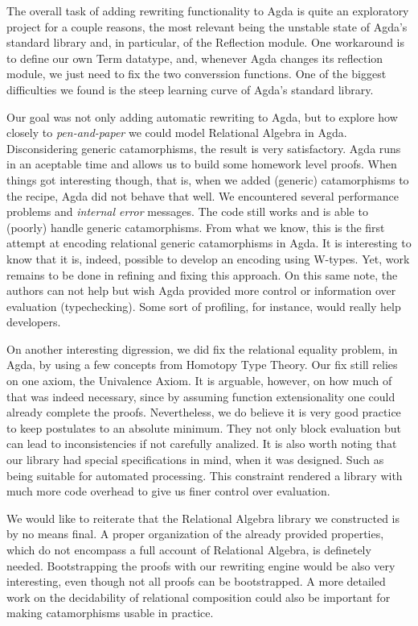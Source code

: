 The overall task of adding rewriting functionality to Agda is quite an exploratory 
project for a couple reasons, the most relevant being the unstable state of Agda's
standard library and, in particular, of the Reflection module. One workaround
is to define our own Term datatype, and, whenever Agda changes its reflection module,
we just need to fix the two converssion functions. One of the biggest difficulties
we found is the steep learning curve of Agda's standard library.

Our goal was not only adding automatic rewriting to Agda, but to explore how closely
to \emph{pen-and-paper} we could model Relational Algebra in Agda. Disconsidering generic catamorphisms,
the result is very satisfactory. Agda runs in an aceptable time and allows us to build
some homework level proofs. When things got interesting though, that is, when we added (generic) catamorphisms to
the recipe, Agda did not behave that well. We encountered several performance problems
and \emph{internal error} messages. The code still works and is able to (poorly) handle
generic catamorphisms. From what we know, this is the first attempt at encoding relational generic catamorphisms
in Agda. It is interesting to know that it is, indeed, possible to develop an encoding using W-types. Yet,
work remains to be done in refining and fixing this approach. On this same note, the authors
can not help but wish Agda provided more control or information over evaluation (typechecking).
Some sort of profiling, for instance, would really help developers.

On another interesting digression, we did fix the relational equality problem, in Agda,
by using a few concepts from Homotopy Type Theory. Our fix still relies on one axiom, the Univalence Axiom.
It is arguable, however, on how much of that was indeed necessary, since by assuming
function extensionality one could already complete the proofs.
Nevertheless, we do believe it is very good practice to keep postulates to an absolute minimum. 
They not only block evaluation but can lead to inconsistencies if not carefully analized. 
It is also worth noting that our library had special specifications in mind, when it was designed.
Such as being suitable for automated processing. This constraint rendered a library
with much more code overhead to give us finer control over evaluation.

We would like to reiterate that the Relational Algebra library we constructed is by no means final.
A proper organization of the already provided properties, which do not encompass a full account
of Relational Algebra, is definetely needed. Bootstrapping the proofs with our rewriting engine
would be also very interesting, even though not all proofs can be bootstrapped. A more
detailed work on the decidability of relational composition could also be important for
making catamorphisms usable in practice.

